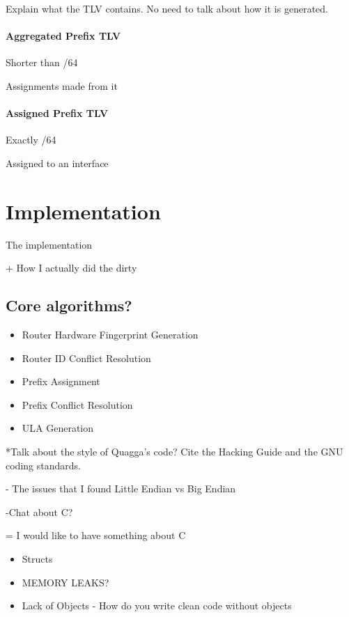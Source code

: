 \documentclass[12pt]{report}
\begin{document}
Explain what the TLV contains. No need to talk about how it is generated.

\subsubsection{Aggregated Prefix TLV}

Shorter than /64 

Assignments made from it

\subsubsection{Assigned Prefix TLV}

Exactly /64 

Assigned to an interface

\chapter{Implementation}
The implementation

+ How I actually did the dirty

\section{Core algorithms?}

\begin{itemize}
  \item Router Hardware Fingerprint Generation
  \item Router ID Conflict Resolution
  \item Prefix Assignment
  \item Prefix Conflict Resolution
  \item ULA Generation
\end{itemize} 

*Talk about the style of Quagga's code?
Cite the Hacking Guide and the GNU coding standards.

- The issues that I found
    Little Endian vs Big Endian
    
-Chat about C?

= I would like to have something about C

\begin{itemize}
  \item Structs
  \item MEMORY LEAKS?
  \item Lack of Objects - How do you write clean code without objects
\end{itemize}
\end{document}

